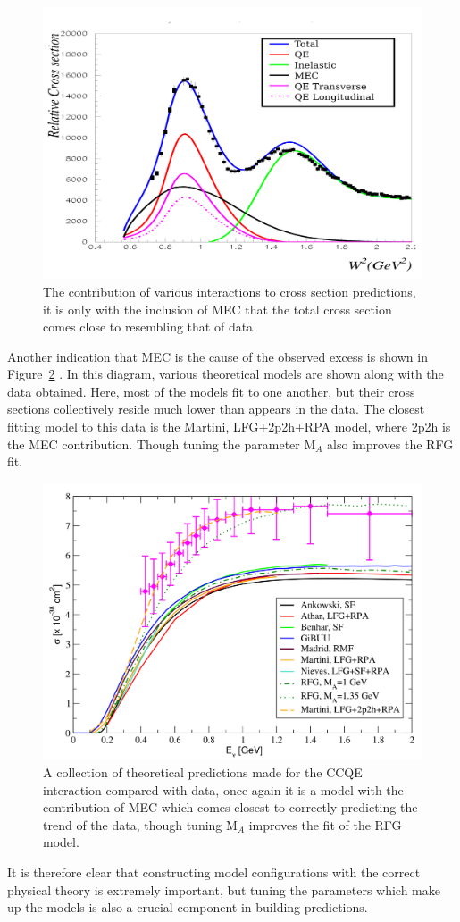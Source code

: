     \begin{figure}[h!]
        \centering
        \includegraphics[width=.8\textwidth]{images/dip_region_3.png}
        \caption{The contribution of various interactions to cross section predictions, it is only with the inclusion of MEC that the total cross section comes close to resembling that of data}
        \label{fig:dipReg}
    \end{figure}

    Another indication that MEC is the cause of the observed excess is shown in Figure~\ref{fig:CCQEXsec} \cite{xsecModels}. In this diagram, various theoretical models are shown along with the data obtained. Here, most of the models fit to one another, but their cross sections collectively reside much lower than appears in the data. The closest fitting model to this data is the Martini, LFG+2p2h+RPA model, where 2p2h is the MEC contribution. Though tuning the parameter M\(_{A}\) also improves the RFG fit.  

    \begin{figure}[h!]
        \centering
        \includegraphics[width=.8\textwidth]{images/CCQE_xsec_2.png}
        \caption{A collection of theoretical predictions made for the CCQE interaction compared with data, once again it is a model with the contribution of MEC which comes closest to correctly predicting the trend of the data, though tuning M\(_{A}\) improves the fit of the RFG model.}
        \label{fig:CCQEXsec}
    \end{figure}

It is therefore clear that constructing model configurations with the correct physical theory is extremely important, but tuning the parameters which make up the models is also a crucial component in building predictions.

\clearpage
